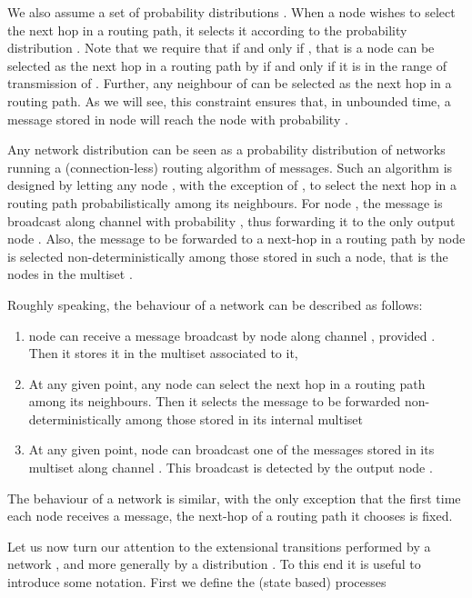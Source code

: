 \documentclass{LMCS}
\begin{document}
We also assume a set of probability distributions 
. When a node  
wishes to select the next hop in a routing path, 
it selects it according to the probability distribution 
. Note that we require that  
if and only if , 
that is a node can be selected as the next hop in a routing 
path by  if and only if it is in the range of transmission 
of . Further, any neighbour of  can be selected 
as the next hop in a routing path. As we will see, this constraint 
ensures that, in unbounded time, a message stored in node  
will reach the node  with probability .

Any network distribution  
can be seen as a probability distribution of networks running a 
(connection-less) routing algorithm of  messages. 
Such an algorithm is designed by letting any node , with the exception of 
, to select the next hop 
in a routing path probabilistically among its neighbours. 
For node , the message is broadcast along channel  
with probability , thus forwarding it to the only output node 
.
Also, the message to be forwarded to a next-hop in a 
routing path by node  is selected non-deterministically 
among those stored in such a node, that is the nodes in 
the multiset . 



Roughly speaking, the behaviour of a network  
can be described as follows:
\begin{enumerate}
\item node  can receive a message  broadcast by node 
 along channel , provided . Then it stores it 
in the multiset associated to it,
\item At any given point, any node  
can select the next hop in a routing path among its neighbours. 
Then it selects the message to be forwarded non-deterministically 
among those stored in its internal multiset
\item At any given point, node  can broadcast one of 
the messages stored in its multiset along channel . 
This broadcast is detected by the output node .
\end{enumerate}

\noindent The behaviour of a network  
is similar, with the only exception that the first time 
each node receives a message, the next-hop of a routing 
path it chooses is fixed.

Let us now turn our attention to the extensional 
transitions performed by a network , 
and more generally by a distribution .
To this end it is useful to introduce 
some notation. 
First we define the (state based) processes
\end{document}
